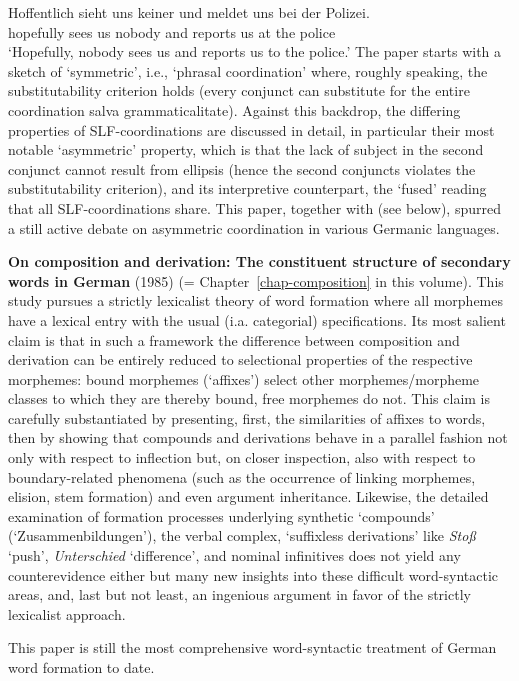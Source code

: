 \begin{refsection}
\ea
\gll  	Hoffentlich sieht  uns keiner   und  meldet uns bei der Polizei. \\
	hopefully    sees   us   nobody and  reports us    at  the police\\
\glt `Hopefully, nobody sees us and reports us to the police.'
\z
%
\addlines
The paper starts with a sketch of `symmetric', i.e., `phrasal coordination' where, roughly speaking, the substitutability criterion holds (every conjunct can substitute for the entire coordination salva grammaticalitate). Against this backdrop, the differing properties of SLF-coordinations are discussed in detail, in particular their most notable `asymmetric' property, which is that the lack of subject in the second conjunct cannot result from ellipsis (hence the second conjuncts violates the substitutability criterion), and its interpretive counterpart, the `fused' reading that all SLF-coordinations share. 
This paper, together with  (see below), spurred a still active debate on asymmetric coordination in various Germanic languages. 

\textbf{On composition and derivation: The constituent structure of secondary words in German} (1985) (= Chapter~\ref{chap-composition} in this volume). This study pursues a strictly lexicalist theory of word formation where all morphemes have a lexical entry with the usual (i.a. categorial) specifications. Its most salient claim is that in such a framework the difference between composition and derivation can be entirely reduced to selectional properties of the respective morphemes: bound morphemes (`affixes') select other morphemes/morpheme classes to which they are thereby bound, free morphemes do not. This claim is carefully substantiated by presenting, first, the similarities of affixes to words, then by showing that compounds and derivations behave in a parallel fashion not only with respect to inflection but, on closer inspection, also with respect to boundary-related phenomena (such as the occurrence of linking morphemes, elision, stem formation) and even argument inheritance. Likewise, the detailed examination of formation processes underlying synthetic `compounds' (`Zusammenbildungen'), the verbal complex, `suffixless derivations' like \emph{Stoß} `push', \emph{Unterschied} `difference', and nominal infinitives does not yield any counterevidence either but many new insights into these difficult word-syntactic areas, and, last but not least, an ingenious argument in favor of the strictly lexicalist approach. 

This paper is still the most comprehensive word-syntactic treatment of German word formation to date. 


\end{refsection}
